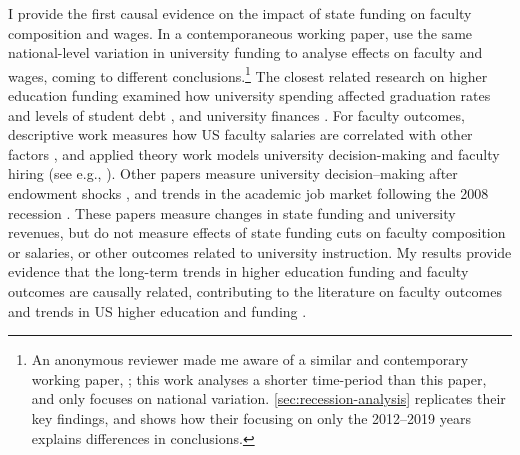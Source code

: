 I provide the first causal evidence on the impact of state funding on faculty composition and wages.
In a contemporaneous working paper, \cite{hinrichs2022state} use the same national-level variation in university funding to analyse effects on faculty and wages, coming to different conclusions.\footnote{
    An anonymous reviewer made me aware of a similar and contemporary working paper, \cite{hinrichs2022state}; this work analyses a shorter time-period than this paper, and only focuses on national variation.
    \autoref{sec:recession-analysis} replicates their key findings, and shows how their focusing on only the 2012--2019 years explains differences in conclusions.
}
The closest related research on higher education funding examined how university spending affected graduation rates and levels of student debt \citep{NBERw23736,NBERw27885}, and university finances \citep{miller2022making,bound2019public,webber2017state}.
For faculty outcomes, descriptive work measures how US faculty salaries are correlated with other factors \citep{hilmer2020labor}, and applied theory work models university decision-making and faculty hiring (see e.g., \citealt{abe2015implications,johnson2009jep,NBERc13879}).
Other papers measure university decision--making after endowment shocks \citep{brown2014endowment}, and trends in the academic job market following the 2008 recession \citep{turner2014impact}.
These papers measure changes in state funding and university revenues, but do not measure effects of state funding cuts on faculty composition or salaries, or other outcomes related to university instruction.
My results provide evidence that the long-term trends in higher education funding and faculty outcomes are causally related, contributing to the literature on faculty outcomes \citep{ehrenberg2003studying} and trends in US higher education and funding \citep{hoxby2009changing,ehrenberg2012american}.

